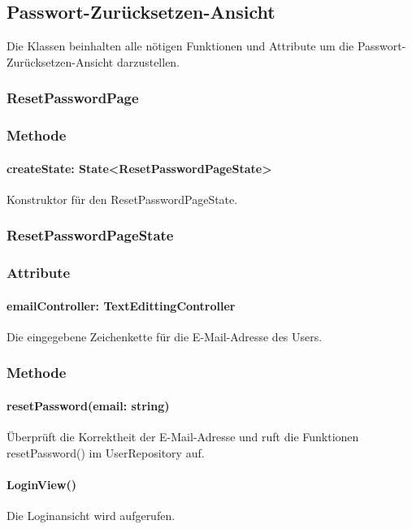 \documentclass{entwurfsheft}
\begin{document}
\newpage

\subsection{Passwort-Zurücksetzen-Ansicht}
Die Klassen beinhalten alle nötigen Funktionen und Attribute um die Passwort-Zurücksetzen-Ansicht darzustellen.

\subsubsection{ResetPasswordPage}\label{sec:ResetPasswordPage}
\subsubsection*{Methode}
\paragraph*{createState: State<ResetPasswordPageState>} Konstruktor für den ResetPasswordPageState.

\subsubsection{ResetPasswordPageState}\label{sec:ResetPasswordPageState}
\subsubsection*{Attribute}
\paragraph*{emailController: TextEdittingController} Die eingegebene Zeichenkette für die E-Mail-Adresse des Users.

\subsubsection*{Methode}
\paragraph*{resetPassword(email: string)} Überprüft die Korrektheit der E-Mail-Adresse und ruft die Funktionen resetPassword() im UserRepository auf.
\paragraph*{LoginView()} Die Loginansicht wird aufgerufen.
\end{document}
